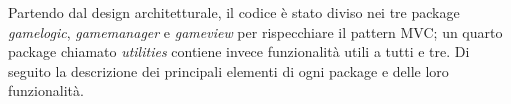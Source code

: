 Partendo dal design architetturale, il codice è stato diviso nei tre package \textit{gamelogic}, \textit{gamemanager} e \textit{gameview} per rispecchiare il pattern MVC; un quarto package chiamato \textit{utilities} contiene invece funzionalità utili a tutti e tre. Di seguito la descrizione dei principali elementi di ogni package e delle loro funzionalità.